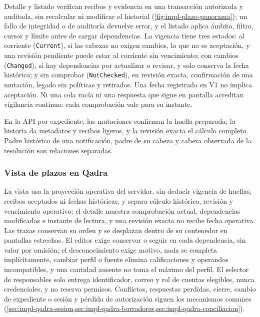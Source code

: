 Detalle y listado verifican recibos y evidencia en una transacción autorizada y auditada, sin recalcular ni modificar el historial (\cref{fig:impl-plazo-panorama}); un fallo de integridad o de auditoría devuelve error, y el listado aplica ámbito, filtro, cursor y límite antes de cargar dependencias. La vigencia tiene tres estados: al corriente (\texttt{Current}), si las cabezas no exigen cambios, lo que no es aceptación, y una revisión pendiente puede estar al corriente sin vencimiento; con cambios (\texttt{Changed}), si hay dependencias por actualizar o revisar, y solo conserva la fecha histórica; y sin comprobar (\texttt{NotChecked}), en revisión exacta, confirmación de una mutación, legado sin políticas y retirados. Una fecha registrada en V1 no implica aceptación. Ni una cola vacía ni una respuesta que sigue en pantalla acreditan vigilancia continua: cada comprobación vale para su instante.

En la API por expediente, las mutaciones confirman la huella preparada; la historia da metadatos y recibos ligeros, y la revisión exacta el cálculo completo. Padre histórico de una notificación, padre de su cabeza y cabeza observada de la resolución son relaciones separadas.

\subsubsection{Vista de plazos en Qadra}

La vista usa la proyección operativa del servidor, sin deducir vigencia de huellas, recibos aceptados ni fechas históricas, y separa cálculo histórico, revisión y vencimiento operativo; el detalle muestra comprobación actual, dependencias modificadas e instante de lectura, y una revisión exacta no recibe fecha operativa. Las trazas conservan su orden y se desplazan dentro de su contenedor en pantallas estrechas. El editor exige conservar o seguir en cada dependencia, sin valor por omisión; el desconocimiento exige motivo, nada se completa implícitamente, cambiar perfil o fuente elimina calificaciones y operandos incompatibles, y una cantidad ausente no toma el máximo del perfil. El selector de responsables solo entrega identificador, correo y rol de cuentas elegibles, nunca credenciales, y no reserva permisos. Conflictos, respuestas perdidas, cierre, cambio de expediente o sesión y pérdida de autorización siguen los mecanismos comunes (\cref{sec:impl-qadra-sesion,sec:impl-qadra-borradores,sec:impl-qadra-conciliacion}).


